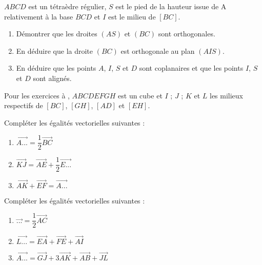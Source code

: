 \begin{colonne*exercice}
\begin{exercice}\label{G2Exo36}
  $ABCD$ est un tétraèdre régulier, $S$ est le pied de la hauteur
  issue de A relativement à la base $BCD$ et $I$ est le milieu de
  $[BC]$.

  \begin{center}
    
  \end{center}

  \begin{enumerate}
  \item Démontrer que les droites $(AS)$ et $(BC)$ sont orthogonales.
  \item En déduire que la droite $(BC)$ est orthogonale au plan
    $(AIS)$.
  \item En déduire que les points $A$, $I$, $S$ et $D$ sont
    coplanaires et que les points $I$, $S$ et $D$ sont alignés.
  \end{enumerate}
\end{exercice}


Pour les exercices  à , $ABCDEFGH$ est un cube et $I$ ; $J$ ; $K$
et $L$ les milieux respectifs de $[BC]$, $[GH]$, $[AD]$ et $[EH]$.

\begin{center}
  
\end{center}

\begin{exercice}\label{G2Exo37}
  Compléter les égalités vectorielles suivantes :
  \begin{enumerate}
  \item $\overrightarrow{A...}=\dfrac{1}{2}\overrightarrow{BC}$
  \item
    $\overrightarrow{KJ}=\overrightarrow{AE}+\dfrac{1}{2}\overrightarrow{E...}$
  \item
    $\overrightarrow{AK}+\overrightarrow{EF}=\overrightarrow{A...}$
  \end{enumerate}
\end{exercice}

\begin{exercice}
  Compléter les égalités vectorielles suivantes :
  \begin{enumerate}
  \item $\overrightarrow{...}=\dfrac{1}{2}\overrightarrow{AC}$
  \item
    $\overrightarrow{L...}=\overrightarrow{EA}+\overrightarrow{FE}+\overrightarrow{AI}$
  \item
    $\overrightarrow{A...}=\overrightarrow{GJ}+3\overrightarrow{AK}+\overrightarrow{AB}+\overrightarrow{JL}$
  \end{enumerate}
\end{exercice}


\end{colonne*exercice}
